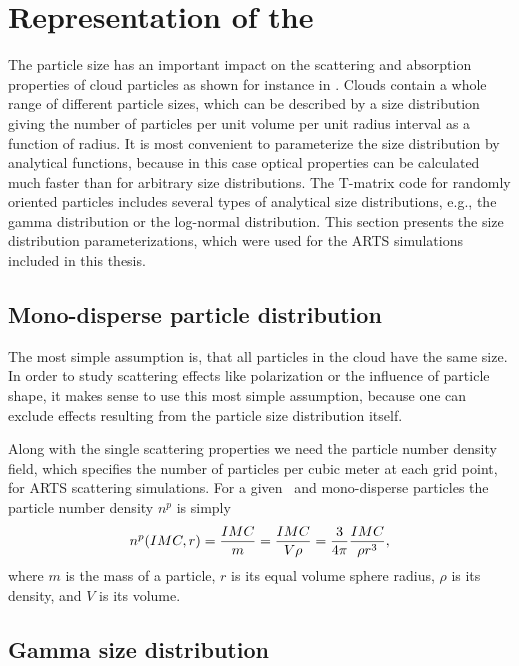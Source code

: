 \section[Particle size distributions]{Representation of the }
\label{sec:clouds:size_distr}

The particle size has an important impact on the scattering and
absorption properties of cloud particles as shown for instance in 
\citep{emde04:_doit_jgr}.  Clouds contain a whole range of
different particle sizes, which can be described by a size
distribution giving the number of particles per unit volume per unit
radius interval as a function of radius.  It is most convenient to
parameterize the size distribution by analytical functions, because in
this case optical properties can be calculated much faster than for
arbitrary size distributions. The T-matrix code for randomly oriented
particles includes several types of analytical size distributions,
e.g., the gamma distribution or the log-normal distribution.  This
section presents the size distribution parameterizations, which were
used for the ARTS simulations included in this thesis.

\subsection{Mono-disperse particle distribution}

The most simple assumption is, that all particles in the cloud have
the same size.  In order to study scattering effects like polarization
or the influence of particle shape, it makes sense to use this most
simple assumption, because one can exclude effects resulting from the
particle size distribution itself.  

Along with the single scattering properties we need the particle
number density field, which specifies the number of particles per
cubic meter at each grid point, for ARTS scattering simulations.  For
a given \imc\ and mono-disperse particles the particle number density
$n^p$ is simply
\begin{equation}
\label{eq:pnd_mono}
  n^p (IMC, r) =\frac{IMC}{m} = \frac{IMC}{V\rho}
    =\frac{3}{4\pi}\frac{IMC}{\rho r^3},  
\end{equation}
where $m$ is the mass of a particle, $r$ is its equal volume sphere
radius, $\rho$ is its density, and $V$ is its volume.
     
\subsection{Gamma size distribution}
\label{sec:clouds:gamma_distr}

